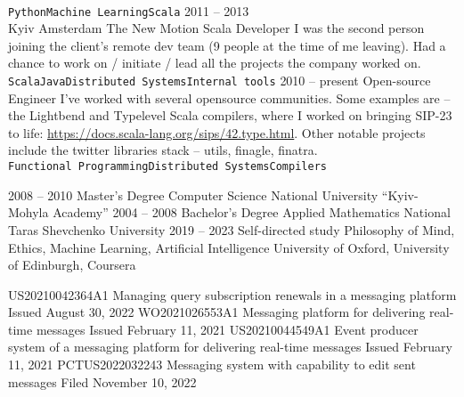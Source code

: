 \documentclass[9pt]{developercv} %
\begin{document}
\begin{entrylist}
{			\\ \texttt{Python}\slashsep\texttt{Machine Learning}\slashsep\texttt{Scala}
		}
	\entry
		{2011 -- 2013\\\footnotesize{Kyiv \newline Amsterdam}}
		{The New Motion}
		{Scala Developer}
		{
			I was the second person joining the client's remote dev team (9 people at the time of me leaving). Had a chance to work on / initiate / lead all the projects the company worked on.
			\\ \texttt{Scala}\slashsep\texttt{Java}\slashsep\texttt{Distributed Systems}\slashsep\texttt{Internal tools}
		}
	\entry
		{2010 -- present}
		{Open-source}
		{Engineer}
		{
			I've worked with several opensource communities. Some examples are -- the Lightbend and Typelevel Scala compilers, where I worked on bringing SIP-23 to life: \href{https://docs.scala-lang.org/sips/42.type.html}{https://docs.scala-lang.org/sips/42.type.html}. Other notable projects include the twitter libraries stack -- utils, finagle, finatra.\\
			\texttt{Functional Programming}\slashsep\texttt{Distributed Systems}\slashsep\texttt{Compilers}
		}
\end{entrylist}



\begin{entrylist}
	\entry
		{2008 -- 2010}
		{Master's Degree}
		{Computer Science}
		{National University “Kyiv-Mohyla Academy”}
	\entry
		{2004 -- 2008}
		{Bachelor's Degree}
		{Applied Mathematics}
		{National Taras Shevchenko University}
	\entry
		{2019 -- 2023}
		{Self-directed study}
		{Philosophy of Mind, Ethics, Machine Learning, Artificial Intelligence}
		{University of Oxford, University of Edinburgh, Coursera}
\end{entrylist}


\begin{entrylist}
	\entry
		{US20210042364A1}
		{Managing query subscription renewals in a messaging platform}
		{}
		{Issued August 30, 2022}
	\entry
		{WO2021026553A1}
		{Messaging platform for delivering real-time messages}
		{}
		{Issued February 11, 2021}
	\entry
		{US20210044549A1}
		{Event producer system of a messaging platform for delivering real-time messages}
		{}
		{Issued February 11, 2021}
	\entry
		{PCTUS2022032243}
		{Messaging system with capability to edit sent messages}
		{}
		{Filed November 10, 2022}
\end{entrylist}

\end{document}
